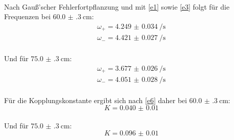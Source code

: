 \\
Nach Gauß'scher Fehlerfortpflanzung und mit \eqref{e1} sowie \eqref{e3} folgt für die Frequenzen bei $\SI{60.0(3)}{\centi\metre}$:
\begin{equation*}
\begin{split}
  \omega_+ = \SI{4.249(34)}{\per\second}\\
  \omega_- = \SI{4.421(27)}{\per\second}
\end{split}
\end{equation*}
\\
Und für $\SI{75.0(3)}{\centi\metre}$:
\begin{equation*}
\begin{split}
  \omega_+ = \SI{3.677(26)}{\per\second}\\
  \omega_- = \SI{4.051(28)}{\per\second}
\end{split}
\end{equation*}
\\
Für die Kopplungskonstante ergibt sich nach \eqref{e6} daher bei $\SI{60.0(3)}{\centi\metre}$:
\begin{equation*}
  K = \num{0.040(10)}
\end{equation*}
\\
Und für $\SI{75.0(3)}{\centi\metre}$:
\begin{equation*}
  K = \num{0.096(10)}
\end{equation*}
\\
